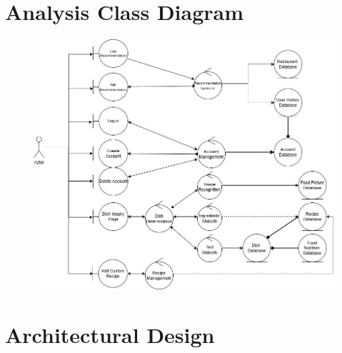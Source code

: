 \documentclass[]{article}
\begin{document}

\section{Analysis Class Diagram}
\label{sec:analysis_class_diagram}
\begin{figure}[H]
	\centering
   \includegraphics[width=\textwidth]{image/D2_2_analysis_class_diagram.png}
\end{figure}


\section{Architectural Design}
\label{sec:architectural_design}
\end{document}
